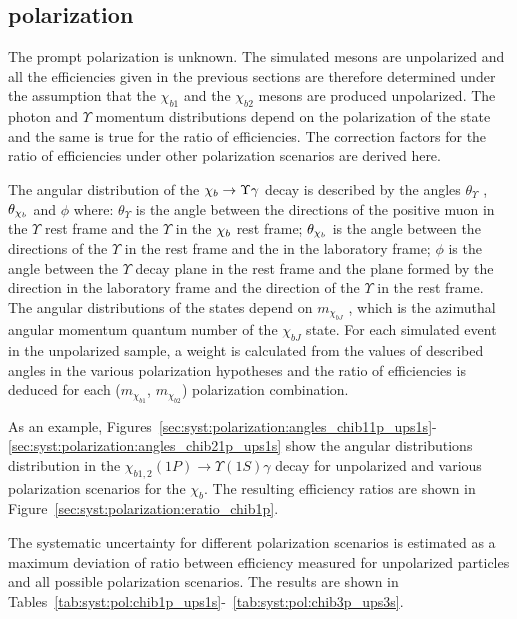\subsection{\chib polarization}
\label{sec:syst:pol}

The prompt \chib polarization is unknown. The simulated \chib mesons are
unpolarized and all the efficiencies given in the previous sections are
therefore determined under the assumption that the $\chi_{b1}$ and the
$\chi_{b2}$ mesons are produced unpolarized. The photon and $\Upsilon$ momentum
distributions depend on the polarization of the \chib state and the same is
true for the ratio of efficiencies. The correction factors for the ratio of
efficiencies under other polarization scenarios are derived here.

The angular distribution of the $\chi_{b} \rightarrow \Upsilon \gamma$ decay is described
by the angles $\theta_{\Upsilon}$ , $\theta_{\chi_{b}}$ and $\phi$ where:
$\theta_{\Upsilon}$ is the angle between the directions of the positive muon in
the $\Upsilon$ rest frame and the $\Upsilon$ in the $\chi_{b}$ rest frame;
$\theta_{\chi_{b}}$ is the angle between the directions of the $\Upsilon$ in the
\chib rest frame and the \chib in the laboratory frame; $\phi$ is the angle
between the $\Upsilon$ decay plane in the \chib rest frame and the plane formed
by the \chib direction in the laboratory frame and the direction of the
$\Upsilon$ in the \chib rest frame. The angular distributions of the
\chib states depend on $m_{\chi_{bJ}}$ , which is the azimuthal angular
momentum quantum number of the $\chi_{bJ}$ state. For each simulated event in
the unpolarized sample, a weight is calculated from the values of described
angles in the various polarization hypotheses and the ratio of efficiencies is
deduced for each ($m_{\chi_{b1}}$, $m_{\chi_{b2}}$) polarization combination.

As an example,
Figures~\ref{sec:syst:polarization:angles_chib11p_ups1s}-\ref{sec:syst:polarization:angles_chib21p_ups1s}
show the angular distributions distribution in the $\chi_{b1,2}(1P) \to
\Upsilon(1S) \gamma$ decay for unpolarized and various polarization scenarios
for the $\chi_b$. The resulting efficiency ratios are shown in
Figure~\ref{sec:syst:polarization:eratio_chib1p}.





The systematic uncertainty for different polarization scenarios is estimated
as a maximum deviation of ratio between efficiency measured for unpolarized
particles and all possible polarization scenarios. The results  are
shown in Tables~\ref{tab:syst:pol:chib1p_ups1s}-~\ref{tab:syst:pol:chib3p_ups3s}.







